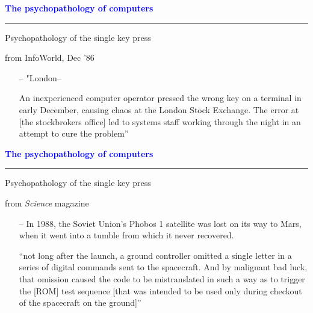 \documentclass[pdf]{beamer}
\begin{document}
\begin{frame}
    \textcolor{Blue}{\textbf{\Large{The psychopathology of computers}}}
    \textcolor{red}{\rule{10cm}{1mm}}
    
{\LARGE{{Psychopathology of the single key press}}}

\vspace{5mm}

	\Large{from InfoWorld, Dec ’86}
    \normalsize
	\begin{itemize}
 		\item[\textcolor{black}{--}] "London-- \newline
 		\item[\textcolor{black}{}] An inexperienced computer operator pressed the wrong key on a terminal in early December, causing chaos at the London Stock Exchange. The error at [the stockbrokers office] led to systems staff working through the night in an attempt to cure the problem”
	\end{itemize}
    

\end{frame}



\begin{frame}
    \textcolor{Blue}{\textbf{\Large{The psychopathology of computers}}}
    \textcolor{red}{\rule{10cm}{1mm}}
    
{\LARGE{{Psychopathology of the single key press}}}

\vspace{5mm}

    \Large{ from \textit{Science} magazine}
    \normalsize
    \begin{itemize}
 		\item[\textcolor{black}{--}] In 1988, the Soviet Union’s Phobos 1 satellite was lost on its way to Mars, when it went into a tumble from which it never recovered. \newline
        \item[\textcolor{black}{}] “not long after the launch, a ground controller omitted a single letter in a series of digital commands sent to the spacecraft. And by malignant bad luck, that omission caused the code to be mistranslated in such a way as to trigger the [ROM] test sequence [that was intended to be used only during checkout of the spacecraft on the ground]”
	
	\end{itemize}
    
\end{frame}
\end{document}

